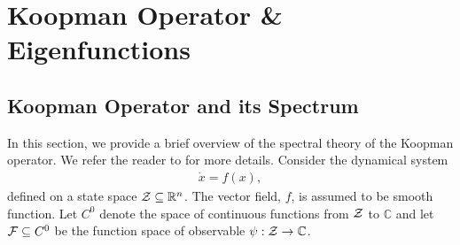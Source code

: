\documentclass[11pt]{article}
\theoremstyle{plain}
\newenvironment{remark}
  {\par\noindent\textbf{Remark. }\normalfont}
  {\hfill$\blacksquare$\par}
\newcommand{\cM}{{\cal M}}
\newcommand{\cZ}{{\cal Z}}
\newcommand{\cC}{{\cal C}}
\newcommand{\cF}{{\cal F}}
\newcommand{\mC}{{\mathbb C}}
\newcommand{\mR}{{\mathbb R}}
\newcommand{\bp}{{\mathbf p}}
\newcommand{\bff}{{\mathbf f}}
\newcommand{\bx}{{\mathbf x}}
\newcommand{\bE}{{\mathbf E}}
\begin{document}
\section{Koopman Operator \& Eigenfunctions} \label{sect:B}

\subsection{Koopman Operator and its Spectrum}
In this section, we provide a brief overview of the spectral theory of the Koopman operator.
We refer the reader to \cite{mezic2020spectrum,mezic2021koopman} for more details. Consider the dynamical system
\begin{align}
    \dot x={f}(x),\label{odesys}
\end{align}
defined on a state space ${\cal Z}\subseteq \mR^n$.  The vector field, $f$, is assumed to be smooth function. Let $C^0$ denote the space of continuous functions from $\cZ$ to $\mC$ and let $\cF\subseteq C^0  $ be the function space of observable $\psi: \cZ\to \mC$.
\end{document}
